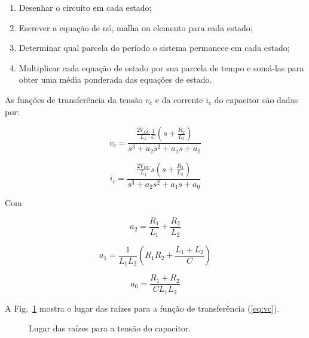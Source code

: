     \begin{enumerate}
        \item Desenhar o circuito em cada estado;
        \item Escrever a equação de nó, malha ou elemento para cada estado;
        \item Determinar qual parcela do período o sistema permanece em cada estado;
        \item Multiplicar cada equação de estado por sua parcela de tempo e somá-las
            para obter uma média ponderada das equações de estado.
    \end{enumerate}

    As funções de transferência da tensão $v_c$ e da corrente $i_c$ do
    capacitor são dadas por:

    \begin{equation}
        v_c = \frac{\frac{2V_{DC}}{L_1} \frac{1}{C} \left( s + \frac{R_2}{L_2} \right)}{s^3 + a_2 s^2 + a_1 s + a_0}
        \label{eq:vc}
    \end{equation}

    \begin{equation}
        i_c = \frac{\frac{2V_{DC}}{L_1} s \left( s + \frac{R_2}{L_2} \right)}{s^3 + a_2 s^2 + a_1 s + a_0}
        \label{eq:ic}
    \end{equation}

    Com

    \begin{equation*}
        a_2 = \frac{R_1}{L_1} + \frac{R_2}{L_2}
    \end{equation*}

    \begin{equation*}
        a_1 = \frac{1}{L_1 L_2} \left( R_1 R_2 + \frac{L_1 + L_2}{C} \right)
    \end{equation*}

    \begin{equation*}
        a_0 = \frac{R_1 + R_2}{C L_1 L_2}
    \end{equation*}


    A Fig.~\ref{fig:rlocus_vc} mostra o lugar das raízes para a função de
    transferência (\ref{eq:vc}).

    \begin{figure}[htb]
        \renewcommand\figurename{Fig.}
        \caption{Lugar das raízes para a tensão do capacitor.}
        \label{fig:rlocus_vc}
    \end{figure}

